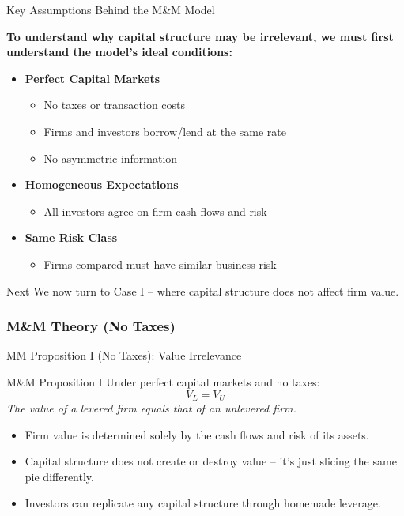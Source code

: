 \begin{frame}{Key Assumptions Behind the M\&M Model}
	
	\textbf{To understand why capital structure may be irrelevant, we must first understand the model's ideal conditions:}
	
	\vspace{0.3cm}
	\begin{itemize}
		\item \textbf{Perfect Capital Markets}
		\begin{itemize}
			\item No taxes or transaction costs
			\item Firms and investors borrow/lend at the same rate
			\item No asymmetric information
		\end{itemize}
		
		\item \textbf{Homogeneous Expectations}
		\begin{itemize}
			\item All investors agree on firm cash flows and risk
		\end{itemize}
		
		\item \textbf{Same Risk Class}
		\begin{itemize}
			\item Firms compared must have similar business risk
		\end{itemize}
	\end{itemize}
	
	\vspace{0.2cm}
	\begin{alertblock}{Next}
		We now turn to Case I -- where capital structure does not affect firm value.
	\end{alertblock}
	
\end{frame}

\subsubsection{M\&M Theory (No Taxes)}
\begin{frame}{MM Proposition I (No Taxes): Value Irrelevance}
	
	\begin{block}{M\&M Proposition I}
		Under perfect capital markets and no taxes:
		\[
		V_L = V_U
		\]
		\textit{The value of a levered firm equals that of an unlevered firm.}
	\end{block}
	
	\begin{itemize}
		\item Firm value is determined solely by the cash flows and risk of its assets.
		\item Capital structure does not create or destroy value -- it's just slicing the same pie differently.
		\item Investors can replicate any capital structure through homemade leverage.
	\end{itemize}
	
	\vspace{0.2cm}
	\tiny{\textcite{modigliani1958cost}}
\end{frame}

